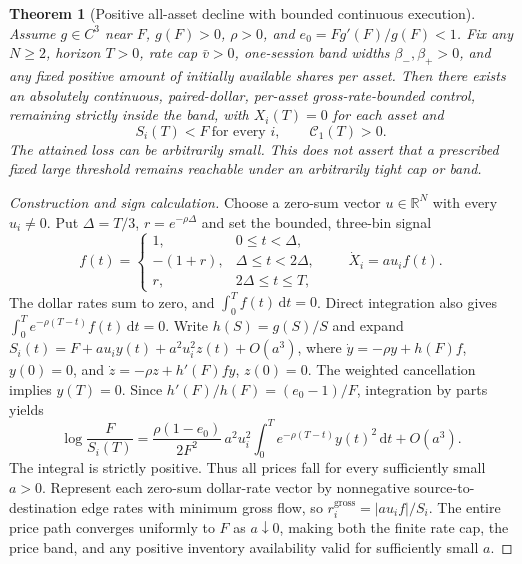 \documentclass[11pt]{article}
\numberwithin{equation}{section}
\newtheorem{theorem}{Theorem}[section]
\theoremstyle{definition}
\theoremstyle{remark}
\newcommand{\R}{\mathbb{R}}
\newcommand{\dd}{\,\mathrm{d}}
\begin{document}
\begin{theorem}[Positive all-asset decline with bounded continuous execution]\label{thm:finite-rate-construct}
Assume $g\in C^3$ near $F$, $g(F)>0$, $\rho>0$, and $e_0=Fg'(F)/g(F)<1$. Fix \emph{any} $N\ge2$, horizon $T>0$, rate cap $\bar v>0$, one-session band widths $\beta_-,\beta_+>0$, and any fixed positive amount of initially available shares per asset. Then there exists an \emph{absolutely continuous}, paired-dollar, per-asset gross-rate-bounded control, remaining strictly inside the band, with $X_i(T)=0$ for each asset and
\begin{equation}\label{eq:local-speed-crash}
 \boxed{\ S_i(T)<F\ \text{for every }i,\qquad \mathcal C_1(T)>0.\ }
\end{equation}
The attained loss can be arbitrarily small. This does \emph{not} assert that a prescribed fixed large threshold remains reachable under an arbitrarily tight cap or band.
\end{theorem}
\begin{proof}[Construction and sign calculation]
Choose a zero-sum vector $u\in\R^N$ with every $u_i\ne0$. Put $\Delta=T/3$, $r=e^{-\rho\Delta}$ and set the bounded, three-bin signal
\begin{equation}\label{eq:bounded-control}
 f(t)=
 \begin{cases}
 1,&0\le t<\Delta,\\
 -(1+r),&\Delta\le t<2\Delta,\\
 r,&2\Delta\le t\le T,
 \end{cases}
 \qquad \dot X_i=a u_i f(t).
\end{equation}
The dollar rates sum to zero, and $\int_0^T f(t)\dd t=0$.
Direct integration also gives $\int_0^T e^{-\rho(T-t)}f(t)\dd t=0$.
Write $h(S)=g(S)/S$ and expand
$S_i(t)=F+a u_i y(t)+a^2u_i^2 z(t)+O(a^3)$,
where $\dot y=-\rho y+h(F)f$, $y(0)=0$, and
$\dot z=-\rho z+h'(F)f y$, $z(0)=0$.
The weighted cancellation implies $y(T)=0$. Since $h'(F)/h(F)=(e_0-1)/F$, integration by parts yields
\begin{equation}\label{eq:finite-rate-coefficient}
 \boxed{\ \log\frac{F}{S_i(T)}=
 \frac{\rho(1-e_0)}{2F^2}\,a^2u_i^2
 \int_0^T e^{-\rho(T-t)}y(t)^2\dd t+O(a^3).\ }
\end{equation}
The integral is strictly positive. Thus all prices fall for every sufficiently small $a>0$. Represent each zero-sum dollar-rate vector by nonnegative source-to-destination edge rates with minimum gross flow, so $r_i^{\mathrm{gross}}=|a u_i f|/S_i$. The entire price path converges uniformly to $F$ as $a\downarrow0$, making both the finite rate cap, the price band, and any positive inventory availability valid for sufficiently small $a$.
\end{proof}
\end{document}
